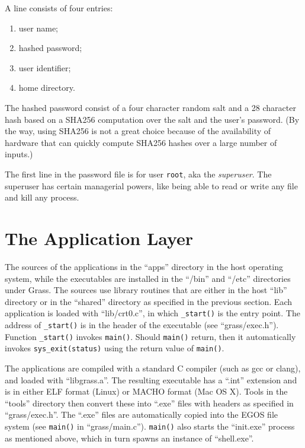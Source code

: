 \documentclass{article}
\begin{document}
A line consists of four entries:
\begin{enumerate}
\item user name;
\item hashed password;
\item user identifier;
\item home directory.
\end{enumerate}

The hashed password consist of a four character random salt and a 28 character
hash based on a SHA256 computation over the salt and the user's password.
(By the way, using SHA256 is not a great choice because of the availability
of hardware that can quickly compute SHA256 hashes over a large number of
inputs.)

The first line in the password file is for user \texttt{root}, aka the
\emph{superuser}.  The superuser has certain managerial powers, like being
able to read or write any file and kill any process.

\section{The Application Layer}

The sources of the applications in the ``apps'' directory in the host
operating system, while the executables are installed in the ``/bin''
and ``/etc'' directories under Grass.  The sources use library
routines that are either in the host ``lib'' directory or in the ``shared''
directory as specified in the previous section.
Each application is loaded with ``lib/crt0.c'', in which \texttt{\_start()}
is the entry point.  The address of \texttt{\_start()} is in the header
of the executable (see ``grass/exec.h'').  Function \texttt{\_start()}
invokes \texttt{main()}.  Should \texttt{main()} return, then it
automatically invokes \texttt{sys\_exit(status)} using the return value
of \texttt{main()}.

The applications are compiled with a standard C compiler (such as gcc or
clang), and loaded with ``libgrass.a''.
The resulting executable has a ``.int'' extension and
is in either ELF format (Linux) or MACHO format (Mac OS X).  Tools in the
``tools'' directory then convert these into ``.exe'' files with headers
as specified in ``grass/exec.h''.
The ``.exe'' files are automatically copied into the EGOS file system
(see \texttt{main()} in ``grass/main.c'').
\texttt{main()} also starts the ``init.exe'' process as mentioned above,
which in turn spawns an instance of ``shell.exe''.
\end{document}
